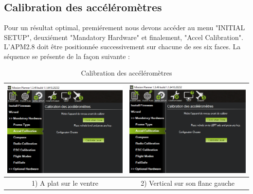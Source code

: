 \documentclass[a4paper,12pt]{book}
\begin{document}
\subsection{Calibration des accéléromètres}
Pour un résultat optimal,  premiérement nous devons accéder au menu "INITIAL SETUP", deuxiément "Mandatory Hardware" et finalement, "Accel Calibration". L'APM2.8 doit être positionnée successivement sur chacune de ses six faces.
La séquence se présente de la façon suivante :
\begin{table}[H]
	\begin{center}
	\caption{Calibration des accéléromètres  }
		
\hspace*{-0.8 cm}	\begin{tabular}{|c|c|}
\hline
\centering
\includegraphics[width=7.5cm]{Images/A plat sur le ventre} & \includegraphics[width=7.5cm]{Images/Vertical sur son flanc gauche}\\
\hline
\centering
			
1) A plat sur le ventre & 2) Vertical sur son flanc gauche \\
		    
\hline



\end{tabular}
\end{center}
\end{table}
\end{document}
